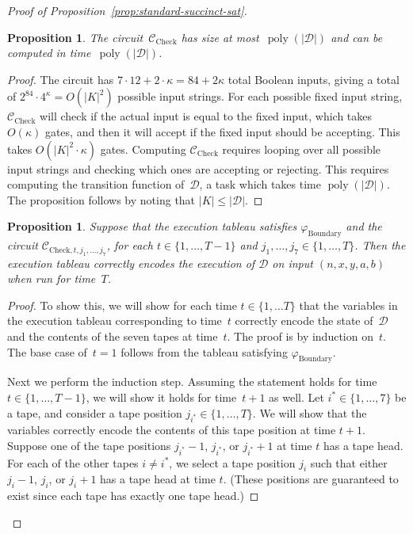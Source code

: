 \documentclass[11pt]{article}
\newtheorem{proposition}[theorem]{Proposition}
\theoremstyle{definition}
\DeclareMathOperator{\poly}{poly}
\newcommand{\decider}{\mathcal{D}}
\newcommand{\circuit}{\mathcal{C}}
\begin{document}
\begin{proof}[Proof of Proposition~\ref{prop:standard-succinct-sat}]
  \begin{proposition}\label{prop:check-size}
    The circuit~$\circuit_{\mathrm{Check}}$ has size at most~$\poly(|\decider|)$
    and can be computed in time~$\poly(|\decider|)$.
  \end{proposition}
  \begin{proof}
    The circuit has $7 \cdot 12 + 2\cdot \kappa = 84 + 2\kappa$ total Boolean
    inputs, giving a total of $2^{84} \cdot 4^\kappa = O(|K|^2)$ possible input
    strings.
    For each possible fixed input string, $\circuit_{\mathrm{Check}}$ will check
    if the actual input is equal to the fixed input, which takes $O(\kappa)$
    gates, and then it will accept if the fixed input should be accepting.
    This takes $O(|K|^2 \cdot \kappa)$ gates.
    Computing $\circuit_{\mathrm{Check}}$ requires looping over all possible
    input strings and checking which ones are accepting or rejecting.
    This requires computing the transition function of~$\decider$, a task which
    takes time $\poly(|\decider|)$.
    The proposition follows by noting that $|K| \leq |\decider|$.
\end{proof}

\begin{proposition}\label{prop:correct-tableau}
  Suppose that the execution tableau satisfies $\varphi_{\mathrm{Boundary}}$ and
  the circuit $\circuit_{\mathrm{Check}, t, j_1, \ldots, j_7}$, for each $t \in
  \{1, \ldots, T-1\}$ and $j_1, \ldots, j_7 \in \{1, \ldots, T\}$.
  Then the execution tableau correctly encodes the execution of $\decider$ on
  input $(n, x,y, a, b)$ when run for time~$T$.
\end{proposition}
\begin{proof}
  To show this, we will show for each time $t \in \{1, \ldots T\}$ that the
  variables in the execution tableau corresponding to time~$t$ correctly encode
  the state of~$\decider$ and the contents of the seven tapes at time~$t$.
  The proof is by induction on~$t$.
  The base case of~$t=1$ follows from the tableau satisfying
  $\varphi_{\mathrm{Boundary}}$.

  Next we perform the induction step.
  Assuming the statement holds for time $t \in \{1, \ldots, T-1\}$, we will show
  it holds for time~$t+1$ as well.
  Let $i^* \in \{1, \ldots, 7\}$ be a tape, and consider a tape position
  $j_{i^*} \in \{1, \ldots, T\}$.
  We will show that the variables correctly encode the contents of this tape
  position at time $t+1$.
  Suppose one of the tape positions $j_{i^*}-1$, $j_{i^*}$, or $j_{i^*}+1$ at
  time $t$ has a tape head.
  For each of the other tapes $i \neq i^*$, we select a tape position $j_{i}$
  such that either $j_{i}-1$, $j_{i}$, or $j_{i}+1$ has a tape head at time $t$.
  (These positions are guaranteed to exist since each tape has exactly one tape
  head.)
  

\end{proof}
\end{proof}
\end{document}
